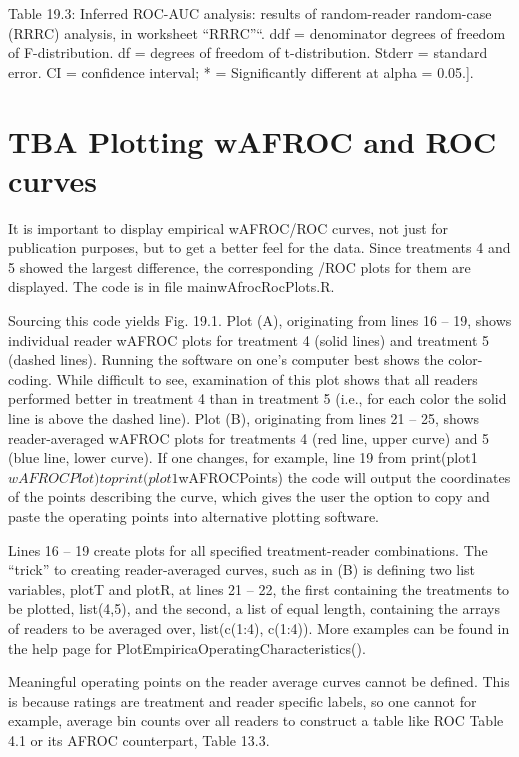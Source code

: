 \documentclass[
]{book}
\begin{document}
Table 19.3: Inferred ROC-AUC analysis: results of random-reader random-case (RRRC) analysis, in worksheet ``RRRC''``. ddf = denominator degrees of freedom of F-distribution. df = degrees of freedom of t-distribution. Stderr = standard error. CI = confidence interval; * = Significantly different at alpha = 0.05.{]}.

\hypertarget{analyzing-froc-data-plotting}{%
\section{TBA Plotting wAFROC and ROC curves}\label{analyzing-froc-data-plotting}}

It is important to display empirical wAFROC/ROC curves, not just for publication purposes, but to get a better feel for the data. Since treatments 4 and 5 showed the largest difference, the corresponding /ROC plots for them are displayed. The code is in file mainwAfrocRocPlots.R.

Sourcing this code yields Fig. 19.1. Plot (A), originating from lines 16 -- 19, shows individual reader wAFROC plots for treatment 4 (solid lines) and treatment 5 (dashed lines). Running the software on one's computer best shows the color-coding. While difficult to see, examination of this plot shows that all readers performed better in treatment 4 than in treatment 5 (i.e., for each color the solid line is above the dashed line). Plot (B), originating from lines 21 -- 25, shows reader-averaged wAFROC plots for treatments 4 (red line, upper curve) and 5 (blue line, lower curve). If one changes, for example, line 19 from print(plot1\(wAFROCPlot) to print(plot1\)wAFROCPoints) the code will output the coordinates of the points describing the curve, which gives the user the option to copy and paste the operating points into alternative plotting software.

Lines 16 -- 19 create plots for all specified treatment-reader combinations. The ``trick'' to creating reader-averaged curves, such as in (B) is defining two list variables, plotT and plotR, at lines 21 -- 22, the first containing the treatments to be plotted, list(4,5), and the second, a list of equal length, containing the arrays of readers to be averaged over, list(c(1:4), c(1:4)). More examples can be found in the help page for PlotEmpiricaOperatingCharacteristics().

Meaningful operating points on the reader average curves cannot be defined. This is because ratings are treatment and reader specific labels, so one cannot for example, average bin counts over all readers to construct a table like ROC Table 4.1 or its AFROC counterpart, Table 13.3.
\end{document}
